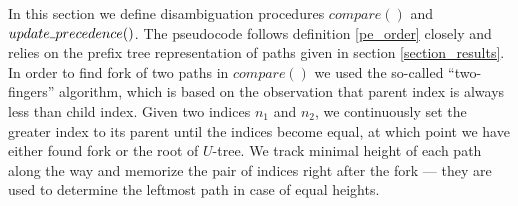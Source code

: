 \documentclass[AMA,STIX1COL]{WileyNJD-v2}
\newcommand{\Xund}{\rule{.4em}{.4pt}}
\begin{document}
In this section we define disambiguation procedures $compare ()$ and $update \Xund precedence ()$.
The pseudocode follows definition \ref{pe_order} closely
and relies on the prefix tree representation of paths given in section \ref{section_results}.
%
In order to find fork of two paths in $compare ()$ we used the so-called ``two-fingers'' algorithm,
which is based on the observation that parent index is always less than child index.
Given two indices $n_1$ and $n_2$, we continuously set the greater index to its parent until the indices become equal,
at which point we have either found fork or the root of $U$-tree.
We track minimal height of each path along the way
and memorize the pair of indices right after the fork --- they are used to determine the leftmost path in case of equal heights.

\medskip
\end{document}
